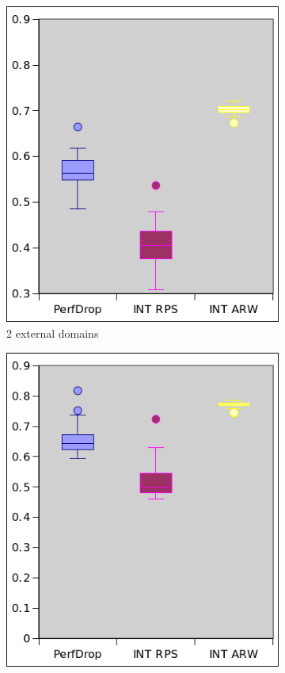 \begin{figure}[!h]
\begin{subfigure}[b]{0.3\textwidth}
                \includegraphics[width=\textwidth]{images/stats3Guest.png}
                \caption{2 external domains}
                \label{fig:box3}
        \end{subfigure}
        \begin{subfigure}[b]{0.3\textwidth}
                \includegraphics[width=\textwidth]{images/stats4Guest.png}

\end{subfigure}
\end{figure}
